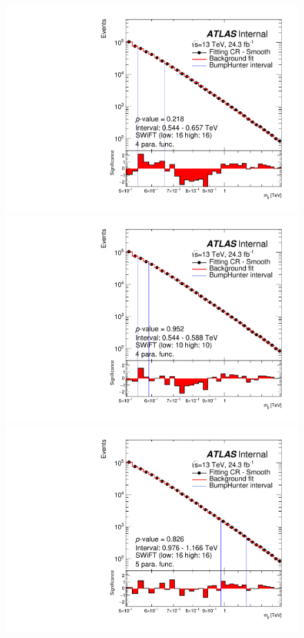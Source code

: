 \begin{figure}[!htb]
\captionsetup[subfigure]{aboveskip=0pt,justification=centering}
\centering
{} {
  \includegraphics[width=0.45\linewidth, angle=0]{figs/Dibjet/LowMass/FitStudy/bhFit_corrFitCR_smooth_4para_low16_high16.pdf}
}
 {
  \includegraphics[width=0.45\linewidth, angle=0]{figs/Dibjet/LowMass/FitStudy/bhFit_corrFitCR_smooth_4para_low10_high10.pdf}
}
 {
  \includegraphics[width=0.45\linewidth, angle=0]{figs/Dibjet/LowMass/FitStudy/bhFit_corrFitCR_smooth_5para_low16_high16.pdf}
}

\end{figure}
